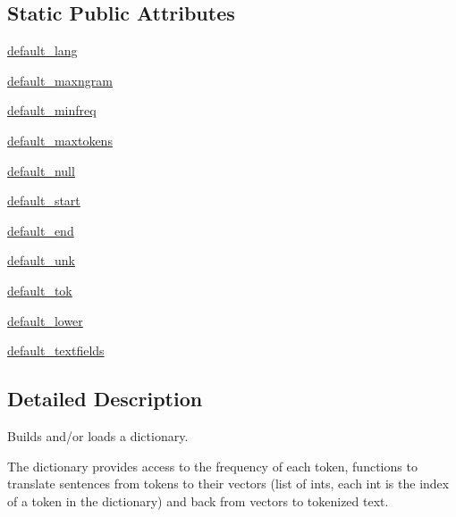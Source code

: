 \subsection*{Static Public Attributes}
\begin{DoxyCompactItemize}
\item 
\hyperlink{classparlai_1_1agents_1_1legacy__agents_1_1seq2seq_1_1dict__v0_1_1DictionaryAgent_a1b0c39070dc3e302bf8514120bcf116b}{default\+\_\+lang}
\item 
\hyperlink{classparlai_1_1agents_1_1legacy__agents_1_1seq2seq_1_1dict__v0_1_1DictionaryAgent_a37daa28f10bdf7c8204755c7d3a40be3}{default\+\_\+maxngram}
\item 
\hyperlink{classparlai_1_1agents_1_1legacy__agents_1_1seq2seq_1_1dict__v0_1_1DictionaryAgent_a5871f2427b8d8ad2255c5472d2775571}{default\+\_\+minfreq}
\item 
\hyperlink{classparlai_1_1agents_1_1legacy__agents_1_1seq2seq_1_1dict__v0_1_1DictionaryAgent_aadb14244f5df0104da206a9198008723}{default\+\_\+maxtokens}
\item 
\hyperlink{classparlai_1_1agents_1_1legacy__agents_1_1seq2seq_1_1dict__v0_1_1DictionaryAgent_a2175a30f4874803be3c939b6439da787}{default\+\_\+null}
\item 
\hyperlink{classparlai_1_1agents_1_1legacy__agents_1_1seq2seq_1_1dict__v0_1_1DictionaryAgent_ae499af91964f532e9907f63fbc5ea597}{default\+\_\+start}
\item 
\hyperlink{classparlai_1_1agents_1_1legacy__agents_1_1seq2seq_1_1dict__v0_1_1DictionaryAgent_ab6041034d125c2298701ad9fd2d0fe9d}{default\+\_\+end}
\item 
\hyperlink{classparlai_1_1agents_1_1legacy__agents_1_1seq2seq_1_1dict__v0_1_1DictionaryAgent_a2151f0d0c610c94adee15c99253953cc}{default\+\_\+unk}
\item 
\hyperlink{classparlai_1_1agents_1_1legacy__agents_1_1seq2seq_1_1dict__v0_1_1DictionaryAgent_aef5213d7be800cc192d418a3f544c269}{default\+\_\+tok}
\item 
\hyperlink{classparlai_1_1agents_1_1legacy__agents_1_1seq2seq_1_1dict__v0_1_1DictionaryAgent_ad258ecce87fe679726c7c71c804ba698}{default\+\_\+lower}
\item 
\hyperlink{classparlai_1_1agents_1_1legacy__agents_1_1seq2seq_1_1dict__v0_1_1DictionaryAgent_a2c27d34a2b02c5698d2c3d16dc303105}{default\+\_\+textfields}
\end{DoxyCompactItemize}


\subsection{Detailed Description}
\begin{DoxyVerb}Builds and/or loads a dictionary.

The dictionary provides access to the frequency of each token, functions to
translate sentences from tokens to their vectors (list of ints, each int is the
index of a token in the dictionary) and back from vectors to tokenized text.
\end{DoxyVerb}
 

